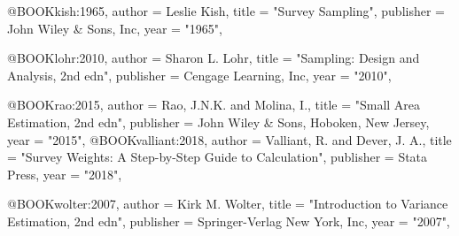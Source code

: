 @BOOK{kish:1965,
       author = {Leslie Kish},
        title = "{Survey Sampling}",
      publisher = {John Wiley & Sons, Inc},
         year = "1965",
}

@BOOK{lohr:2010,
       author = {Sharon L. Lohr},
        title = "{Sampling: Design and Analysis, 2nd edn}",
      publisher = {Cengage Learning, Inc},
         year = "2010",
}

@BOOK{rao:2015,
       author = {Rao, J.N.K. and Molina, I.},
        title = "{Small Area Estimation, 2nd edn}",
      publisher = {John Wiley & Sons, Hoboken, New Jersey},
         year = "2015",
}
@BOOK{valliant:2018,
       author = {Valliant, R. and Dever, J. A.},
        title = "{Survey Weights: A Step-by-Step Guide to Calculation}",
      publisher = {Stata Press},
         year = "2018",
}

@BOOK{wolter:2007,
       author = {Kirk M. Wolter},
        title = "{Introduction to Variance Estimation, 2nd edn}",
      publisher = {Springer-Verlag New York, Inc},
         year = "2007",
}
